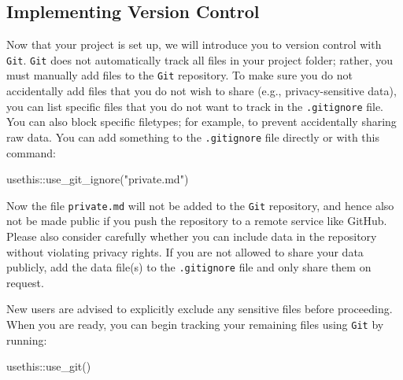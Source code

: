 \documentclass[psych,tutorial,accept,moreauthors,pdftex]{Definitions/mdpi}
\newenvironment{Shaded}{\begin{snugshade}}{\end{snugshade}}
\newcommand{\FunctionTok}[1]{\textcolor[rgb]{0.00,0.00,0.00}{#1}}
\newcommand{\NormalTok}[1]{#1}
\newcommand{\SpecialCharTok}[1]{\textcolor[rgb]{0.00,0.00,0.00}{#1}}
\newcommand{\StringTok}[1]{\textcolor[rgb]{0.31,0.60,0.02}{#1}}
\begin{document}
\begin{paracol}{2}
\subsection{Implementing Version
Control}\label{implementing-version-control}

Now that your project is set up, we will introduce you to version
control with \texttt{Git}. \texttt{Git} does not automatically track all
files in your project folder; rather, you must manually add files to the
\texttt{Git} repository. To make sure you do not accidentally add files
that you do not wish to share (e.g., privacy-sensitive data), you can
list specific files that you do not want to track in the
\texttt{.gitignore} file. You can also block specific filetypes; for
example, to prevent accidentally sharing raw data. You can add something
to the \texttt{.gitignore} file directly or with this command:

\begin{adjustwidth}{0.5cm}{0cm} 
\begin{Shaded}
\begin{Highlighting}[]
\NormalTok{usethis}\SpecialCharTok{::}\FunctionTok{use\_git\_ignore}\NormalTok{(}\StringTok{"private.md"}\NormalTok{)}
\end{Highlighting}
\end{Shaded}
\end{adjustwidth}

Now the file \texttt{private.md} will not be added to the \texttt{Git}
repository, and hence also not be made public if you push the repository
to a remote service like GitHub. Please also consider carefully whether
you can include data in the repository without violating privacy rights.
If you are not allowed to share your data publicly, add the data file(s)
to the \texttt{.gitignore} file and only share them on request.

New users are advised to explicitly exclude any sensitive files before
proceeding. When you are ready, you can begin tracking your remaining
files using \texttt{Git} by running:

\begin{adjustwidth}{0.5cm}{0cm} 
\begin{Shaded}
\begin{Highlighting}[]
\NormalTok{usethis}\SpecialCharTok{::}\FunctionTok{use\_git}\NormalTok{()}
\end{Highlighting}
\end{Shaded}
\end{adjustwidth}



\end{paracol}
\end{document}
